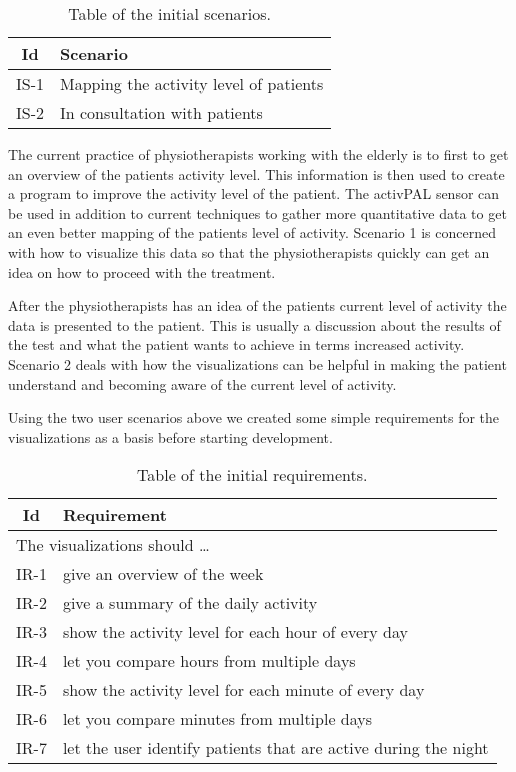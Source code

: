 \begin{table}[!h]
  \centering
  \begin{tabular}{|c|l|}
    \hline
    \textbf{Id} & \textbf{Scenario} \\ \hline
    IS-1 & Mapping the activity level of patients \\ \hline
    IS-2 & In consultation with patients \\ \hline
  \end{tabular}
  \caption{Table of the initial scenarios.}
\end{table}

The current practice of physiotherapists working with the elderly is to first to get an overview of the patients activity level. This information is then used to create a program to improve the activity level of the patient. The activPAL sensor can be used in addition to current techniques to gather more quantitative data to get an even better mapping of the patients level of activity. Scenario 1 is concerned with how to visualize this data so that the physiotherapists quickly can get an idea on how to proceed with the treatment.

After the physiotherapists has an idea of the patients current level of activity the data is presented to the patient. This is usually a discussion about the results of the test and what the patient wants to achieve in terms increased activity. Scenario 2 deals with how the visualizations can be helpful in making the patient understand and becoming aware of the current level of activity.

Using the two user scenarios above we created some simple requirements for the visualizations as a basis before starting development.

\begin{table}[h!]
  \begin{center}
  \begin{tabular}{|c|p{12cm}|}
    \hline
      \textbf{Id} & \textbf{Requirement} \\ \hline
    \multicolumn{2}{|l|}{The visualizations should \ldots} \\ \hline
      IR-1 & give an overview of the week \\ \hline
      IR-2 & give a summary of the daily activity \\ \hline
      IR-3 & show the activity level for each hour of every day \\ \hline
      IR-4 & let you compare hours from multiple days \\ \hline
      IR-5 & show the activity level for each minute of every day \\ \hline
      IR-6 & let you compare minutes from multiple days \\ \hline
      IR-7 & let the user identify patients that are active during the night \\ \hline
  \end{tabular}
  \end{center}
  \caption{Table of the initial requirements.} 
\end{table}
